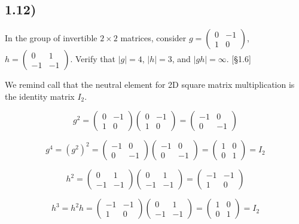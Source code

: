 \subsection*{1.12)}

In the group of invertible $2 \times 2$ matrices, consider $g = \begin{pmatrix} 0 & -1 \\ 1 & 0 \end{pmatrix}$, $h = \begin{pmatrix} 0 & 1 \\ -1 & -1 \end{pmatrix}$. Verify that $|g| = 4$, $|h| = 3$, and $|gh| = \infty$. [§1.6]

We remind call that the neutral element for 2D square matrix multiplication is the identity matrix $I_2$.

$$
g^2 = \begin{pmatrix} 0 & -1 \\ 1 & 0 \end{pmatrix} \begin{pmatrix} 0 & -1 \\ 1 & 0 \end{pmatrix}
    = \begin{pmatrix} -1 & 0 \\ 0 & -1 \end{pmatrix}
$$

$$
g^4 = (g^2)^2
    = \begin{pmatrix} -1 & 0 \\ 0 & -1 \end{pmatrix} \begin{pmatrix} -1 & 0 \\ 0 & -1 \end{pmatrix}
    = \begin{pmatrix}  1 & 0 \\ 0 &  1 \end{pmatrix}
    = I_2
$$

$$
h^2 = \begin{pmatrix} 0 & 1 \\ -1 & -1 \end{pmatrix} \begin{pmatrix} 0 & 1 \\ -1 & -1 \end{pmatrix} 
	= \begin{pmatrix} -1 & -1 \\ 1 & 0 \end{pmatrix}
$$

$$
h^3 = h^2 h
    = \begin{pmatrix} -1 & -1 \\ 1 & 0 \end{pmatrix} \begin{pmatrix} 0 & 1 \\ -1 & -1 \end{pmatrix}
	= \begin{pmatrix} 1 & 0 \\ 0 & 1 \end{pmatrix}
	= I_2
$$


